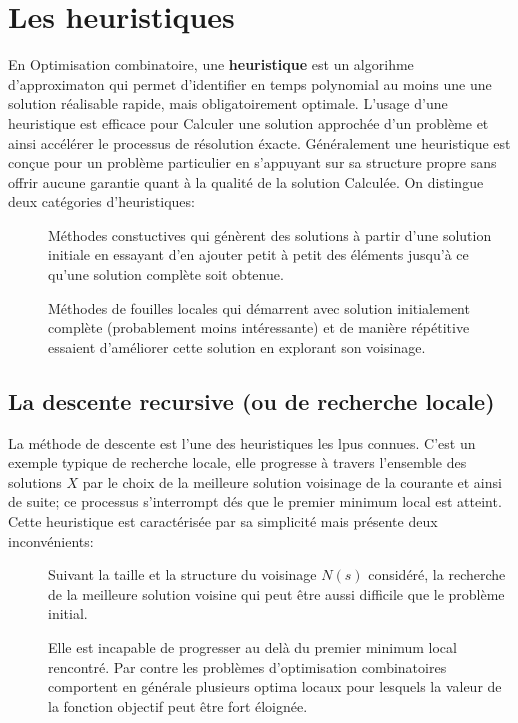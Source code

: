 \documentclass[a4paper,11pt,oneside]{report}
\theoremstyle{plain}
\newcommand{\0}{/ \! \! \! 0}
\theoremstyle{plain}
\begin{document}
\section{Les heuristiques}
En Optimisation combinatoire, une {\bf heuristique} est un algorihme d'approximaton qui permet d'identifier en temps polynomial au moins une 
une solution r\'ealisable rapide, mais obligatoirement optimale. L'usage d'une heuristique est efficace pour Calculer une solution approch\'ee
 d'un probl\`eme et ainsi acc\'el\'erer le processus de r\'esolution \'exacte. G\'en\'eralement une heuristique est con\c{c}ue pour un probl\`eme
 particulier en s'appuyant sur sa structure propre sans offrir aucune garantie quant \`a la qualit\'e de la solution Calcul\'ee. On distingue deux 
 cat\'egories d'heuristiques:
 \begin{description}
  \item[] M\'ethodes constuctives qui g\'en\`erent des solutions \`a partir d'une solution initiale en essayant d'en ajouter petit \`a petit 
  des \'el\'ements jusqu'\`a ce qu'une solution compl\`ete soit obtenue.
  \item[] M\'ethodes de fouilles locales qui d\'emarrent avec solution initialement compl\`ete (probablement moins int\'eressante) et de mani\`ere 
  r\'ep\'etitive essaient d'am\'eliorer cette solution en explorant son voisinage.
 \end{description}
\subsection*{La descente recursive (ou de recherche locale)}
La m\'ethode de descente est l'une des heuristiques les lpus connues. C'est un exemple typique de recherche locale, elle progresse \`a travers l'ensemble 
des solutions $X$ par le choix de la meilleure solution voisinage de la courante et ainsi de suite; ce processus s'interrompt d\'es que le premier minimum 
local est atteint.\\
Cette heuristique est caract\'eris\'ee par sa simplicit\'e mais pr\'esente deux inconv\'enients:
\begin{description}
 \item[] Suivant la taille et la structure du voisinage $N(s)$ consid\'er\'e, la recherche de la meilleure solution voisine qui peut \^etre 
 aussi difficile que le probl\`eme initial.
 \item[] Elle est incapable de progresser au del\`a du premier minimum local rencontr\'e. Par contre les probl\`emes d'optimisation combinatoires
  comportent en g\'en\'erale plusieurs optima locaux pour lesquels la valeur de la fonction objectif peut \^etre fort \'eloign\'ee.
\end{description}
\end{document}

